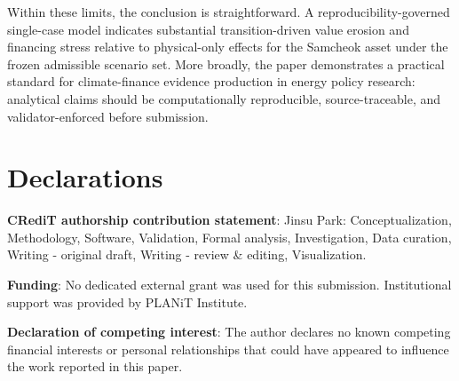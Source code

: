 \documentclass[preprint,12pt]{elsarticle}
\begin{document}
Within these limits, the conclusion is straightforward. A reproducibility-governed single-case model indicates substantial transition-driven value erosion and financing stress relative to physical-only effects for the Samcheok asset under the frozen admissible scenario set. More broadly, the paper demonstrates a practical standard for climate-finance evidence production in energy policy research: analytical claims should be computationally reproducible, source-traceable, and validator-enforced before submission.

\section*{Declarations}
\textbf{CRediT authorship contribution statement}: Jinsu Park: Conceptualization, Methodology, Software, Validation, Formal analysis, Investigation, Data curation, Writing - original draft, Writing - review \& editing, Visualization.

\textbf{Funding}: No dedicated external grant was used for this submission. Institutional support was provided by PLANiT Institute.

\textbf{Declaration of competing interest}: The author declares no known competing financial interests or personal relationships that could have appeared to influence the work reported in this paper.



\end{document}
